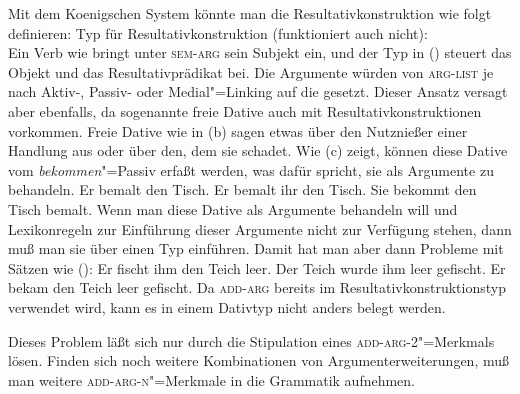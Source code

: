 Mit dem Koenigschen System könnte man die Resultativkonstruktion wie folgt definieren:
\eas
Typ für Resultativkonstruktion (funktioniert auch nicht):\\
\zs
Ein Verb wie  bringt unter \textsc{sem-arg} sein Subjekt ein, und der
Typ in () steuert das Objekt und das Resultativprädikat bei. Die Argumente
würden von \textsc{arg-list} je nach Aktiv-, Passiv- oder Medial"=Linking
auf die \subcatl gesetzt. Dieser Ansatz versagt aber ebenfalls, da sogenannte freie
Dative auch mit Resultativkonstruktionen vorkommen. Freie
Dative wie in
(b) sagen etwas über den Nutznießer einer Handlung aus oder über den, dem sie schadet.
Wie (c) zeigt, können diese Dative vom \emph{bekommen}"=Passiv
erfaßt werden, was dafür spricht, sie als Argumente zu behandeln.
\eal
\ex Er bemalt den Tisch.
\ex Er bemalt ihr den Tisch.
\ex Sie bekommt den Tisch bemalt.
\zl
Wenn man diese Dative als Argumente behandeln will und Lexikonregeln zur Einführung
dieser Argumente nicht zur Verfügung stehen, dann muß man sie über einen Typ einführen.
Damit hat man aber dann Probleme mit Sätzen wie ():
\eal
\ex Er fischt ihm den Teich leer.
\ex Der Teich wurde ihm leer gefischt.
\ex Er bekam den Teich leer gefischt.
\zl
Da \textsc{add-arg} bereits im Resultativkonstruktionstyp verwendet wird, kann es in einem
Dativtyp nicht anders belegt werden.

Dieses Problem läßt sich nur durch die Stipulation eines \textsc{add-arg-2}"=Merkmals lösen. Finden
sich noch weitere Kombinationen von Argumenterweiterungen, muß man weitere \textsc{add-arg-n}"=Merkmale
in die Grammatik aufnehmen.

